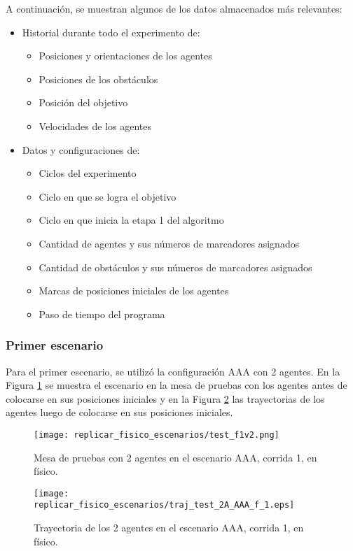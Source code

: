 A continuación, se muestran algunos de los datos almacenados más relevantes:

\begin{itemize}
	\item Historial durante todo el experimento de:
	\begin{itemize}
		\item Posiciones y orientaciones de los agentes
		\item Posiciones de los obstáculos
		\item Posición del objetivo
		\item Velocidades de los agentes
	\end{itemize}
	\item Datos y configuraciones de:
	\begin{itemize}
		\item Ciclos del experimento
		\item Ciclo en que se logra el objetivo
		\item Ciclo en que inicia la etapa 1 del algoritmo
		\item Cantidad de agentes y sus números de marcadores asignados
		\item Cantidad de obstáculos y sus números de marcadores asignados
		\item Marcas de posiciones iniciales de los agentes
		\item Paso de tiempo del programa
	\end{itemize}
\end{itemize}

\subsubsection{Primer escenario}
Para el primer escenario, se utilizó la configuración AAA con 2 agentes. En la Figura \ref{fig:test_fisico1} se muestra el escenario en la mesa de pruebas con los agentes antes de colocarse en sus posiciones iniciales y en la Figura \ref{fig:traj_test_2A_AAA_f_1} las trayectorias de los agentes luego de colocarse en sus posiciones iniciales.

\begin{figure}[H]
	\centering
	\texttt{[image: replicar\_fisico\_escenarios/test\_f1v2.png]}
	\caption{Mesa de pruebas con 2 agentes en el escenario AAA, corrida 1, en físico.}
	\label{fig:test_fisico1}
\end{figure}
\begin{figure}[H]
	\centering
	\texttt{[image: replicar\_fisico\_escenarios/traj\_test\_2A\_AAA\_f\_1.eps]}
	\caption{Trayectoria de los 2 agentes en el escenario AAA, corrida 1, en físico.}
	\label{fig:traj_test_2A_AAA_f_1}
\end{figure}

